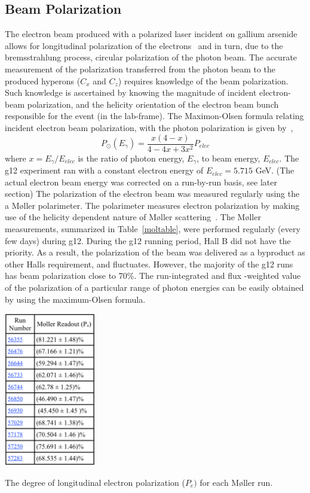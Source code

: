 \subsection{\label{sec:calib.pol}Beam Polarization}
The electron beam produced with a polarized laser incident on gallium arsenide allows for longitudinal polarization of the electrons~\cite{polarizedelectronsnew} and in turn, due to the bremsstrahlung process, circular polarization of the photon beam.  The accurate measurement of the polarization transferred from the photon beam to the produced hyperons ($C_x$ and $C_z$) requires knowledge of the beam polarization.  Such knowledge is ascertained by knowing the magnitude of incident electron-beam polarization, and the helicity orientation of the electron beam bunch responsible for the event (in the lab-frame). The Maximon-Olsen formula relating incident electron beam polarization, with the photon polarization is given by~\cite{MaximonOlsen},
\begin{equation}
P_\odot(E_\gamma) = \frac{x(4-x)}{4 - 4x + 3x^2}P_{elec}
\end{equation}
where $x = E_\gamma /E_{elec}$ is the ratio of photon energy, $E_\gamma$, to beam energy, $E_{elec}$. The g12 experiment ran with a constant electron energy of $E_{elec} = 5.715$ GeV.  (The actual electron beam energy was corrected on a run-by-run basis, see later section) The polarization of the electron beam was measured regularly using the a M{\o}ller polarimeter.  The polarimeter measures electron polarization by making use of the helicity dependent nature of M{\o}ller scattering~\cite{Mecking,Carman}. The M{\o}ller measurements, summarized in Table~\ref{moltable}, were performed regularly (every few days) during g12. During the g12 running period, Hall B did not have the priority. As a result, the polarization of the beam was delivered as a byproduct as other Halls requirement, and fluctuates. However, the majority of the g12 runs has beam polarization close to 70\%. The run-integrated and flux -weighted value of the polarization of a particular range of photon energies can be easily obtained by using the maximum-Olsen formula.

\begin{table}[htpb]
\begin{center}
 \includegraphics[width=0.3\textwidth]{figures/calib/pol/moltable.eps}
  \caption{The degree of longitudinal electron polarization ($P_e)$ for each M{\o}ller run. }
  \label{moltable}
  \end{center}
\end{table}

